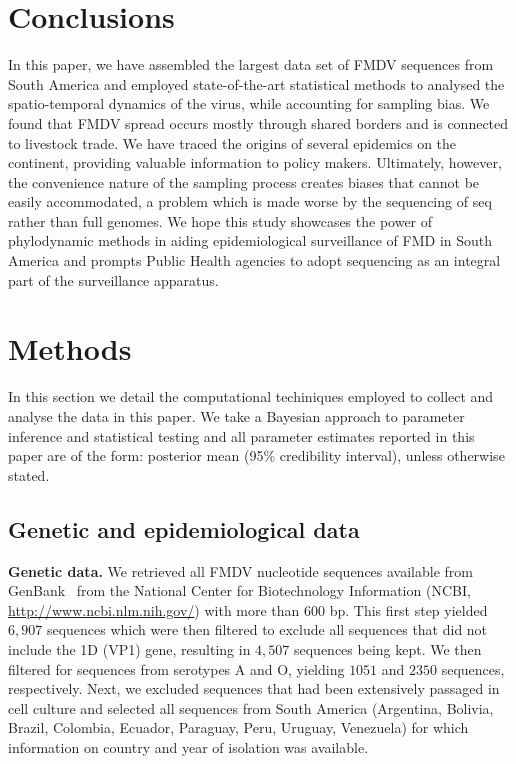 \documentclass[10pt]{article}
\begin{document}
\section*{Conclusions}

In this paper, we have assembled the largest data set of FMDV sequences from South America and employed state-of-the-art statistical methods to analysed the spatio-temporal dynamics of the virus, while accounting for sampling bias.
We found that FMDV spread occurs mostly through shared borders and  is connected to livestock trade.
We have traced the origins of several epidemics on the continent, providing valuable information to policy makers.
Ultimately, however, the convenience nature of the sampling process creates biases that cannot be easily accommodated, a problem which is made worse by the sequencing of seq rather than full genomes.
We hope this study showcases the power of phylodynamic methods in aiding epidemiological surveillance of FMD in South America and prompts Public Health agencies to adopt sequencing as an integral part of the surveillance apparatus. 

\section*{Methods}

In this section we detail the computational techiniques employed to collect and analyse the data in this paper.
We take a Bayesian approach to parameter inference and statistical testing and all parameter estimates reported in this paper are of the form: posterior mean (95\% credibility interval), unless otherwise stated.

\subsection*{Genetic and epidemiological data}

\textbf{Genetic data.}
We retrieved all FMDV nucleotide sequences available from GenBank~\citep{Benson2013} from the National Center for Biotechnology Information (NCBI, \url{ http://www.ncbi.nlm.nih.gov/}) with more than $600$ bp.
This first step yielded $6, 907$ sequences which were then filtered to exclude all sequences that did not include the 1D (VP1) gene, resulting in $4, 507$ sequences being kept.
We then filtered for sequences from serotypes A and O, yielding $1051$ and $2350$ sequences, respectively.
Next, we excluded sequences that had been extensively passaged in cell culture and selected all sequences from South America (Argentina, Bolivia, Brazil, Colombia, Ecuador, Paraguay, Peru, Uruguay, Venezuela) for which information on country and year of isolation was available.
\end{document}
